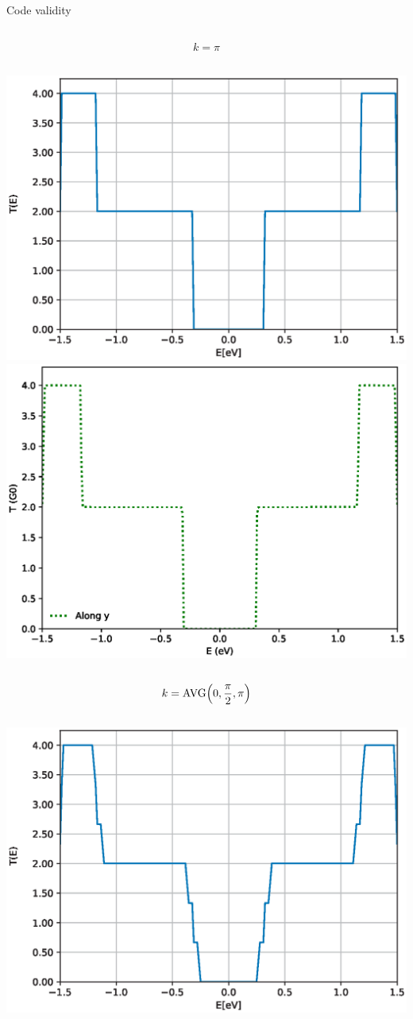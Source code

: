 \documentclass[hyperref={colorlinks=true,urlcolor=blue,linkcolor=.},aspectratio=1610,mathserif]{beamer}
\begin{document}
\begin{frame}{Code validity}
\begin{overprint}
\begin{columns}[t]
		\end{columns}
		\centering
		\begin{align*}
			k = \pi
		\end{align*}
		\begin{columns}[t]
			\includegraphics[width=.9\textwidth]{Figures/NPGNormal_pi.eps}
			\includegraphics[width=.87\textwidth]{Figures/txy_pi.eps}
		\end{columns}
		\centering
		\begin{align*}
			k = \mathrm{AVG}\pqty{0,\frac{\pi}{2},\pi}
		\end{align*}
		\begin{columns}[t]
			\includegraphics[width=.9\textwidth]{Figures/NPGNormal_AVER.eps}

\end{columns}
\end{overprint}
\end{frame}
\end{document}
